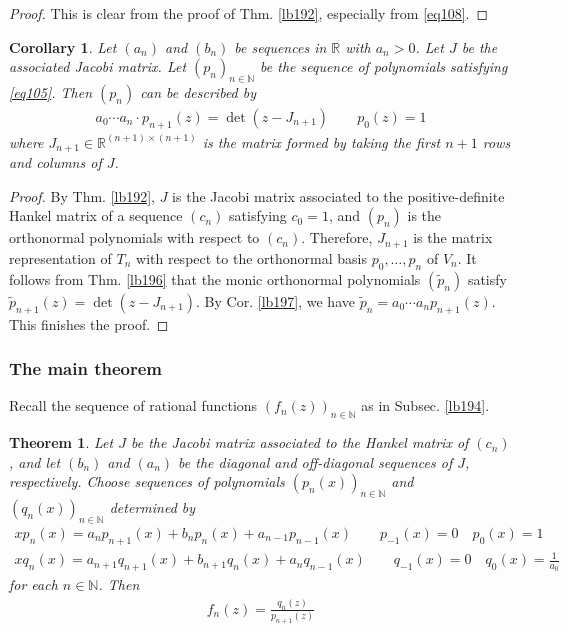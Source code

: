\documentclass[12pt,b5paper,notitlepage]{article}
\theoremstyle{definition}
\theoremstyle{plain}
\newtheorem{thm}[df]{Theorem}
\newtheorem{co}[df]{Corollary}
\newcommand{\wtd}{\widetilde}
\newcommand{\Nbb}{\mathbb N}
\newcommand{\Rbb}{\mathbb R}
\numberwithin{equation}{section}
\begin{document}
\begin{proof}
This is clear from the proof of Thm. \ref{lb192}, especially from \eqref{eq108}.
\end{proof}



\begin{co}\label{lb199}
Let $(a_n)$ and $(b_n)$ be sequences in $\Rbb$ with $a_n>0$. Let $J$ be the associated Jacobi matrix. Let $(p_n)_{n\in\Nbb}$ be the sequence of polynomials satisfying \eqref{eq105}. Then $(p_n)$ can be described by
\begin{align}
a_0\cdots a_n\cdot p_{n+1}(z)=\det(z-J_{n+1})\qquad p_0(z)=1
\end{align}
where $J_{n+1}\in\Rbb^{(n+1)\times(n+1)}$ is the matrix formed by taking the first $n+1$ rows and columns of $J$.
\end{co}


\begin{proof}
By Thm. \ref{lb192}, $J$ is the Jacobi matrix associated to the positive-definite Hankel matrix of a sequence $(c_n)$ satisfying $c_0=1$, and $(p_n)$ is the orthonormal polynomials with respect to $(c_n)$. Therefore, $J_{n+1}$ is the matrix representation of $T_n$ with respect to the orthonormal basis $p_0,\dots,p_n$ of $V_n$. It follows from Thm. \ref{lb196} that the monic orthonormal polynomials $(\wtd p_n)$ satisfy $\wtd p_{n+1}(z)=\det(z-J_{n+1})$. By Cor. \ref{lb197}, we have $\wtd p_n=a_0\cdots a_n p_{n+1}(z)$. This finishes the proof.
\end{proof}




\subsubsection{The main theorem}

Recall the sequence of rational functions $(f_n(z))_{n\in\Nbb}$ as in Subsec. \ref{lb194}.


\begin{thm}\label{lb200}
Let $J$ be the Jacobi matrix associated to the Hankel matrix of $(c_n)$, and let $(b_n)$ and $(a_n)$ be the diagonal and off-diagonal sequences of $J$, respectively. Choose sequences of polynomials $(p_n(x))_{n\in\Nbb}$ and $(q_n(x))_{n\in\Nbb}$ determined by
\begin{gather}
xp_n(x)=a_np_{n+1}(x)+b_np_n(x)+a_{n-1}p_{n-1}(x)\qquad p_{-1}(x)=0\quad p_0(x)=1\label{eq111}\\
xq_n(x)=a_{n+1}q_{n+1}(x)+b_{n+1}q_n(x)+a_nq_{n-1}(x)\qquad q_{-1}(x)=0\quad q_0(x)=\frac{1}{a_0}\label{eq112}
\end{gather}
for each $n\in\Nbb$. Then
\begin{align}\label{eq113}
f_n(z)=\frac{q_n(z)}{p_{n+1}(z)}
\end{align}
\end{thm}
\end{document}
